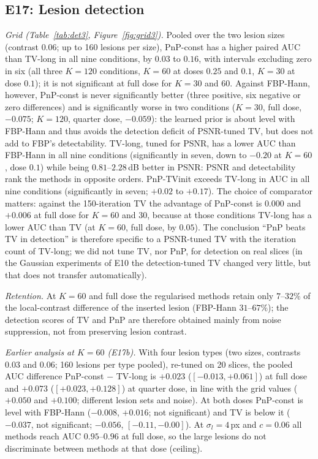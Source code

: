 \subsection{E17: Lesion detection}\label{sec:e17}
\emph{Grid (Table~\ref{tab:det3}, Figure~\ref{fig:grid3}).} Pooled over the two lesion sizes (contrast $0.06$; up to 160 lesions per size), PnP-const has a higher paired AUC than TV-long in all nine conditions, by $0.03$ to $0.16$, with intervals excluding zero in six (all three $K=120$ conditions, $K=60$ at doses $0.25$ and $0.1$, $K=30$ at dose $0.1$); it is not significant at full dose for $K=30$ and $60$.
Against FBP-Hann, however, PnP-const is never significantly better (three positive, six negative or zero differences) and is significantly worse in two conditions ($K=30$, full dose, $-0.075$; $K=120$, quarter dose, $-0.059$): the learned prior is about level with FBP-Hann and thus avoids the detection deficit of PSNR-tuned TV, but does not add to FBP's detectability.
TV-long, tuned for PSNR, has a lower AUC than FBP-Hann in all nine conditions (significantly in seven, down to $-0.20$ at $K=60$, dose $0.1$) while being $0.81$--$2.28$\,dB better in PSNR: PSNR and detectability rank the methods in opposite orders. PnP-TVinit exceeds TV-long in AUC in all nine conditions (significantly in seven; $+0.02$ to $+0.17$).
The choice of comparator matters: against the 150-iteration TV the advantage of PnP-const is $0.000$ and $+0.006$ at full dose for $K=60$ and $30$, because at those conditions TV-long has a lower AUC than TV (at $K=60$, full dose, by $0.05$). The conclusion ``PnP beats TV in detection'' is
therefore specific to a PSNR-tuned TV with the iteration count of TV-long; we did not tune TV, nor PnP, for detection on real slices (in the Gaussian experiments of E10 the detection-tuned TV changed very little, but that does not transfer automatically).

\emph{Retention.} At $K=60$ and full dose the regularised methods retain only $7$--$32\%$ of the local-contrast difference of the inserted lesion (FBP-Hann $31$--$67\%$); the detection scores of TV and PnP are therefore obtained mainly from noise suppression, not from preserving lesion contrast.

\emph{Earlier analysis at $K=60$ (E17b).} With four lesion types (two sizes, contrasts $0.03$ and $0.06$; 160 lesions per type pooled), re-tuned on 20 slices, the pooled AUC difference PnP-const $-$ TV-long is $+0.023$ ($[-0.013,+0.061]$) at full dose and $+0.073$ ($[+0.023,+0.128]$) at quarter dose, in line with the grid values ($+0.050$ and $+0.100$; different lesion sets and noise). At both doses PnP-const is level with FBP-Hann ($-0.008$, $+0.016$; not significant) and TV is below it ($-0.037$, not significant; $-0.056$, $[-0.11,-0.00]$).
At $\sigma_l=4$\,px and $c=0.06$ all methods reach AUC $0.95$--$0.96$ at full dose, so the large lesions do not discriminate between methods at that dose (ceiling).


